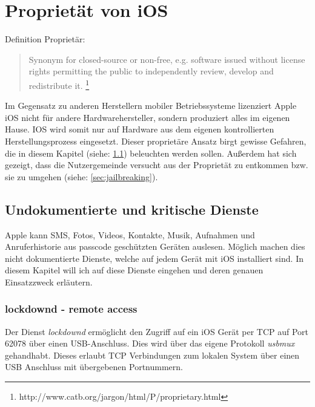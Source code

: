 \section{Proprietät von iOS}
	Definition Proprietär:
	\begin{quote}
		Synonym for closed-source or non-free, e.g. software issued without license
		rights permitting the public to independently review, develop and redistribute it.
		\footnote{http://www.catb.org/jargon/html/P/proprietary.html}
	\end{quote}
	Im Gegensatz zu anderen Herstellern mobiler Betriebssysteme lizenziert Apple
	iOS nicht für andere Hardwarehersteller, sondern produziert alles im
	eigenen Hause. IOS wird somit nur auf Hardware aus dem eigenen kontrollierten
	Herstellungsprozess eingesetzt. Dieser proprietäre Ansatz birgt gewisse
	Gefahren, die in diesem Kapitel (siehe: \ref{sec:undocumented-services})
	beleuchten werden sollen. Außerdem hat sich gezeigt, dass die Nutzergemeinde
	versucht aus der Proprietät zu entkommen bzw. sie zu umgehen (siehe:
	\ref{sec:jailbreaking}).
	
	\subsection{Undokumentierte und kritische Dienste}\label{sec:undocumented-services}
		Apple kann SMS, Fotos, Videos, Kontakte, Musik, Aufnahmen und Anruferhistorie
		aus passcode geschützten Geräten auslesen. Möglich machen dies nicht
		dokumentierte Dienste, welche auf jedem Gerät mit iOS installiert sind. In
		diesem Kapitel will ich auf diese Dienste eingehen und deren genauen
		Einsatzzweck erläutern.
		\subsubsection{lockdownd - remote access}
			Der Dienst \textsl{lockdownd} ermöglicht den Zugriff auf ein iOS Gerät
			per TCP auf Port 62078 über einen USB-Anschluss. Dies wird über das eigene
			Protokoll \textsl{usbmux} gehandhabt. Dieses erlaubt TCP Verbindungen zum
			lokalen System über einen USB Anschluss mit übergebenen	Portnummern.

